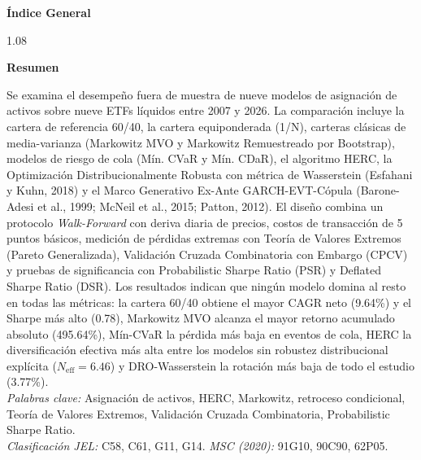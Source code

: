 \documentclass[11pt,a4paper]{article}
\begin{document}
\vfill
{}

\newpage
\thispagestyle{empty}

\vspace*{1cm}
\begin{center}
{\large\bfseries\color{navyblue} Índice General}
\end{center}
\vspace{0.2cm}

\begin{spacing}{1.08}
\small
\makeatletter
{}
\makeatother
\end{spacing}

\newpage
{}

\begin{center}
\textbf{\large\color{navyblue} Resumen}
\end{center}
\vspace{0.2cm}

\noindent Se examina el desempeño fuera de muestra de nueve modelos de asignación de activos sobre nueve ETFs líquidos entre 2007 y 2026. La comparación incluye la cartera de referencia 60/40, la cartera equiponderada (1/N), carteras clásicas de media-varianza (Markowitz MVO y Markowitz Remuestreado por Bootstrap), modelos de riesgo de cola (Mín. CVaR y Mín. CDaR), el algoritmo HERC, la Optimización Distribucionalmente Robusta con métrica de Wasserstein (Esfahani y Kuhn, 2018) y el Marco Generativo Ex-Ante GARCH-EVT-Cópula (Barone-Adesi et al., 1999; McNeil et al., 2015; Patton, 2012). El diseño combina un protocolo \textit{Walk-Forward} con deriva diaria de precios, costos de transacción de 5 puntos básicos, medición de pérdidas extremas con Teoría de Valores Extremos (Pareto Generalizada), Validación Cruzada Combinatoria con Embargo (CPCV) y pruebas de significancia con Probabilistic Sharpe Ratio (PSR) y Deflated Sharpe Ratio (DSR). Los resultados indican que ningún modelo domina al resto en todas las métricas: la cartera 60/40 obtiene el mayor CAGR neto (9.64\%) y el Sharpe más alto (0.78), Markowitz MVO alcanza el mayor retorno acumulado absoluto (495.64\%), Mín-CVaR la pérdida más baja en eventos de cola, HERC la diversificación efectiva más alta entre los modelos sin robustez distribucional explícita ($N_{\text{eff}} = 6.46$) y DRO-Wasserstein la rotación más baja de todo el estudio (3.77\%).\\[0.35cm]
\indent \textit{Palabras clave:} Asignación de activos, HERC, Markowitz, retroceso condicional, Teoría de Valores Extremos, Validación Cruzada Combinatoria, Probabilistic Sharpe Ratio.\\[0.2cm]
\indent \textit{Clasificación JEL:} C58, C61, G11, G14. \quad \textit{MSC (2020):} 91G10, 90C90, 62P05.
\end{document}
